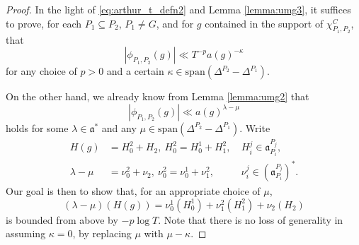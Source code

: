 \documentclass[10pt,a4paper]{amsart}
\newcommand{\ga}{\mathfrak{a}}
\begin{document}
\begin{proof}
In the light of \eqref{eq:arthur_t_defn2} and Lemma \ref{lemma:umg3}, it suffices to prove, for each $P_1 \subseteq P_2$, $P_1 \neq G$, and for $g$ contained in the support of $\chi_{P_1,P_2}^C$, that
\begin{equation*}
|\phi_{P_1,P_2}(g)| \ll T^{-p}a(g)^{-\kappa}
\end{equation*}
for any choice of $p>0$ and a certain $\kappa \in \mathrm{span}(\Delta^{P_2}-\Delta^{P_1})$.

On the other hand, we already know from Lemma \ref{lemma:umg2} that
\begin{equation*}
|\phi_{P_1,P_2}(g)| \ll a(g)^{\lambda-\mu}
\end{equation*}
holds for some $\lambda \in \ga^*$ and any $\mu \in \mathrm{span}(\Delta^{P_2} - \Delta^{P_1})$.
Write
\begin{align*}
H(g) &= H_0^2 + H_2, \ H_0^2 = H_0^1 + H_1^2, \ & H_i^j \in \ga_{P_i}^{P_j}, \\
\lambda-\mu &= \nu_0^2 + \nu_2, \ \nu_0^2 = \nu_0^1 + \nu_1^2, \ & \nu_i^j \in (\ga_{P_i}^{P_j})^*.
\end{align*}
Our goal is then to show that, for an appropriate choice of $\mu$,
\begin{equation*}
(\lambda-\mu)(H(g)) = \nu_0^1(H_0^1) + \nu_1^2(H_1^2) + \nu_2(H_2)
\end{equation*}
is bounded from above by $-p\log T$. Note that there is no loss of generality in assuming $\kappa=0$, by replacing $\mu$ with $\mu - \kappa$.




\end{proof}
\end{document}
